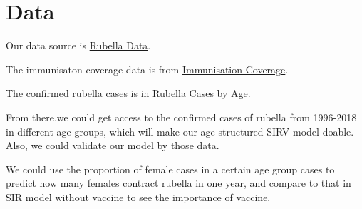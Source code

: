 \documentclass{article}
\theoremstyle{definition}
\begin{document}
\section{Data}
Our data source is \href{https://webarchive.nationalarchives.gov.uk/20140505133414/http://www.hpa.org.uk/Topics/InfectiousDiseases/InfectionsAZ/Rubella/EpidemiologicalData/}{Rubella Data}.

The immunisaton coverage data is from \href{https://webarchive.nationalarchives.gov.uk/20140505192935/http://www.hpa.org.uk/web/HPAweb&HPAwebStandard/HPAweb_C/1195733819251}{Immunisation Coverage}.

The confirmed rubella cases is in \href{https://webarchive.nationalarchives.gov.uk/20140505195855/http://www.hpa.org.uk/web/HPAweb&HPAwebStandard/HPAweb_C/1195733752351}{Rubella Cases by Age}.


From there,we could get access to the confirmed cases of rubella from 1996-2018 in different age groups, which will make our age structured SIRV model doable. Also, we could validate our model by those data.

We could use the proportion of female cases in a certain age group cases to predict how many females contract rubella in one year, and compare to that in SIR model without vaccine to see the importance of vaccine.
\newpage
\printbibliography  
\end{document}

